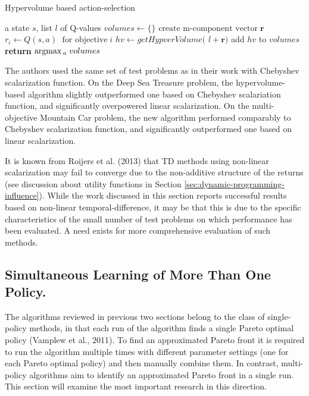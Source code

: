 \begin{algorithm}[tb]
   \caption{Hypervolume based action-selection}
   \label{alg:hb-as}
\begin{algorithmic}
    a state $s$, list $l$ of Q-values
   \STATE  $volumes \leftarrow \{\} $
       \STATE  $ \text{create m-component vector}\; \textbf{r} $
       \STATE  $ r_{i} \leftarrow Q(s,a)\; \text{ for objective}\;i  $
       \ENDFOR
       \STATE $ hv \leftarrow \textit{getHypverVolume( l} + \textbf{r} \textit{)} $  \STATE add $hv$ to $volumes$
   \ENDFOR
   \STATE \textbf{return} $ \mbox{argmax}\,_{a}\; volumes $
\end{algorithmic}
\end{algorithm}

The authors used the same set of test problems as in their work with Chebyshev scalarization function. On the Deep Sea Treasure problem, the hypervolume-based algorithm slightly outperformed one based on Chebyshev scalariation function, and significantly overpowered linear scalarization. On the multi-objective Mountain Car problem, the new algorithm performed comparably to Chebyshev scalarization function, and significantly outperformed one based on linear scalarization.

It is known from Roijers et al. (2013)\nocite{roijers2013survey} that TD methods using non-linear scalarization may fail to converge due to the non-additive structure of the returns (see discussion about utility functions in Section \ref{sec:dynamic-programming-influence}). While the work discussed in this section reports successful results based on non-linear temporal-difference, it may be that this is due to the specific characteristics of the small number of test problems on which performance has been evaluated. A need exists for more comprehensive evaluation of such methods.

\subsection{Simultaneous Learning of More Than One Policy.}
\label{sec:simultaneous-learning-of-more-than-one-policy}
The algorithms reviewed in previous two sections belong to the class of single-policy methods, in that each run of the algorithm finds a single Pareto optimal policy (Vamplew et al., 2011\nocite{vamplew2011empirical}). To find an approximated Pareto front it is required to run the algorithm multiple times with different parameter settings (one for each Pareto optimal policy) and then manually combine them. In contrast, multi-policy algorithms aim to identify an approximated Pareto front in a single run. This section will examine the most important research in this direction.


